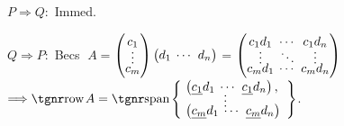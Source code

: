 \par\quad
\!\par\quad
$P\Rightarrow Q:$ \;Immed.\par\vspace{-12pt}\quad
$Q\Rightarrow P:$ \;Becs $\;A={}${\normalsize$\begin{pmatrix}c_1 \\[-4pt] \vdots \\[-5pt] c_m \end{pmatrix}\begin{pmatrix}d_1 & \hspace{-6pt}\cdots & \hspace{-6pt}d_n\end{pmatrix}$}${}={}${\normalsize$\begin{pmatrix} c_1 d_1 & \hspace{-6pt}\cdots & \hspace{-6pt}c_1 d_n\\[-4pt] \vdots & \hspace{-6pt}\ddots & \hspace{-6pt}\vdots \\[-5pt] c_m d_1 & \hspace{-6pt}\cdots & \hspace{-6pt}c_m d_n \end{pmatrix}$} $\Longrightarrow\row A=\Spn${\FontSmall$\MathLeftrightBrace{l}{
	\!\begin{pmatrix}\uline{c_1} d_1 & \hspace{-6pt}\cdots & \hspace{-6pt}\uline{c_1} d_n\end{pmatrix},\\[-6pt] \;\;\;\qquad\vdots\\[-6pt]
	\!\begin{pmatrix}\uline{c_m} d_1 & \hspace{-6pt}\cdots & \hspace{-6pt}\uline{c_m} d_n\end{pmatrix}
}%
$}.\par\vspace{0pt}\quad
